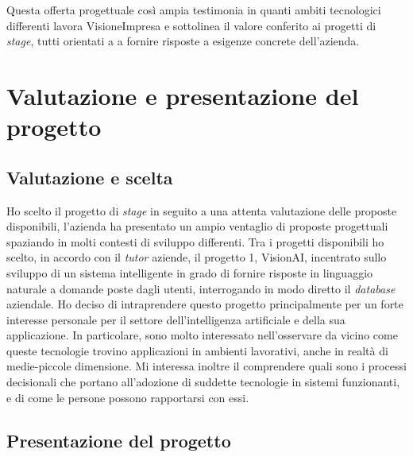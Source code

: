 Questa offerta progettuale così ampia testimonia in quanti ambiti tecnologici differenti lavora VisioneImpresa e sottolinea il valore conferito ai progetti di \textit{stage}, tutti orientati a a fornire risposte a esigenze concrete dell'azienda.





\section{Valutazione e presentazione del progetto}

\subsection{Valutazione e scelta}
Ho scelto il progetto di \textit{stage} in seguito a una attenta valutazione delle proposte disponibili, l'azienda ha presentato un ampio ventaglio di proposte progettuali spaziando in molti contesti di sviluppo differenti.
Tra i progetti disponibili ho scelto, in accordo con il \textit{tutor} aziende, il progetto 1, VisionAI, incentrato sullo sviluppo di un sistema intelligente in grado di fornire risposte in linguaggio naturale a domande poste dagli utenti, interrogando in modo diretto il \textit{database} aziendale.
Ho deciso di intraprendere questo progetto principalmente per un forte interesse personale per il settore dell'intelligenza artificiale e della sua applicazione. In particolare, sono molto interessato nell'osservare da vicino come queste tecnologie trovino applicazioni in ambienti lavorativi, anche in realtà di medie-piccole dimensione. Mi interessa inoltre il comprendere quali sono i processi decisionali che portano all'adozione di suddette tecnologie in sistemi funzionanti, e di come le persone possono rapportarsi con essi.


\subsection{Presentazione del progetto}
\label{subs:Presentazione-progetto}

